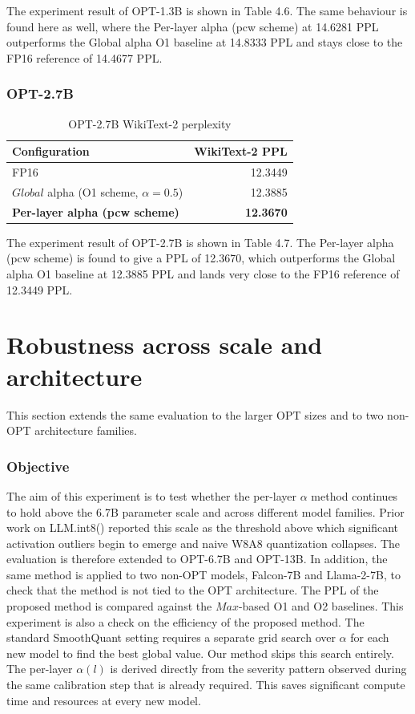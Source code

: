The experiment result of OPT-1.3B is shown in Table 4.6. The same behaviour is found here as well, where the Per-layer alpha (pcw scheme) at 14.6281 PPL outperforms the Global alpha O1 baseline at 14.8333 PPL and stays close to the FP16 reference of 14.4677 PPL.

\subsubsection*{OPT-2.7B}

\begin{table}[h]
\centering
\begin{threeparttable}
\caption{OPT-2.7B WikiText-2 perplexity}
\begin{tabular}{lr}
\hline
Configuration & WikiText-2 PPL \\
\hline
FP16 & 12.3449 \\
$Global$ alpha (O1 scheme, $\alpha=0.5$) & 12.3885 \\
\textbf{Per-layer alpha (pcw scheme)} & \textbf{12.3670} \\
\hline
\end{tabular}
\end{threeparttable}
\end{table}

The experiment result of OPT-2.7B is shown in Table 4.7. The Per-layer alpha (pcw scheme) is found to give a PPL of 12.3670, which outperforms the Global alpha O1 baseline at 12.3885 PPL and lands very close to the FP16 reference of 12.3449 PPL.

\section{Robustness across scale and architecture}

This section extends the same evaluation to the larger OPT sizes and to two non-OPT architecture families.

\subsubsection*{Objective}
The aim of this experiment is to test whether the per-layer $\alpha$ method continues to hold above the 6.7B parameter scale and across different model families. Prior work on LLM.int8() \cite{llm_int8} reported this scale as the threshold above which significant activation outliers begin to emerge and naive W8A8 quantization collapses. The evaluation is therefore extended to OPT-6.7B and OPT-13B. In addition, the same method is applied to two non-OPT models, Falcon-7B and Llama-2-7B, to check that the method is not tied to the OPT architecture. The PPL of the proposed method is compared against the $Max$-based O1 and O2 baselines. This experiment is also a check on the efficiency of the proposed method. The standard SmoothQuant setting requires a separate grid search over $\alpha$ for each new model to find the best global value. Our method skips this search entirely. The per-layer $\alpha(l)$ is derived directly from the severity pattern observed during the same calibration step that is already required. This saves significant compute time and resources at every new model.

